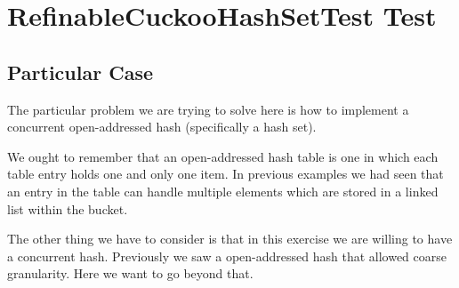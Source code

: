 \section{\textbf{RefinableCuckooHashSetTest Test}}
\subsection{Particular Case}
\par
The particular problem we are trying to solve here is how to implement a
concurrent open-addressed hash (specifically a hash set).
\par
We ought to remember that an open-addressed hash table is one in which each
table entry holds one and only one item. In previous examples we had seen that
an entry in the table can handle multiple elements which are stored in a linked
list within the bucket.
\par
The other thing we have to consider is that in this exercise we are willing to
have a concurrent hash. Previously we saw a open-addressed hash that allowed
coarse granularity. Here we want to go beyond that.
\par
